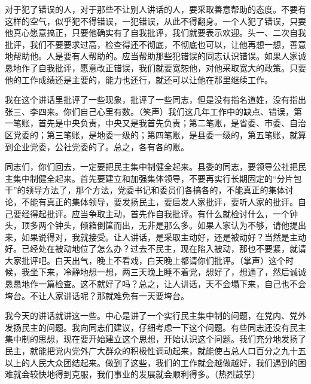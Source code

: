 对于犯了错误的人，对于那些不让别人讲话的人，要采取善意帮助的态度。不要有这样的空气，似乎犯不得错误，一犯错误，从此不得翻身。一个人犯了错误，只要他真心愿意搞正，只要他确实有了自我批评，我们就要表示欢迎。头一、二次自我批评，我们不要要求过高，检查得还不彻底，不彻底也可以，让他再想一想，善意地帮助他。人是要有人帮助的。应当帮助那些犯错误的同志认识错误。如果人家诚恳地作了自我批评，愿意改正错误，我们就要宽恕他，对他采取宽大的政策。只要他的工作成绩还是主要的，能力也还行，就还可以让他在那里继续工作。

我在这个讲话里批评了一些现象，批评了一些同志，但是没有指名道姓，没有指出张三、李四来。你们自己心里有数。（笑声）我们这几年工作中的缺点、错误，第一笔账，首先是中央负责，中央又是我首先负责；第二笔账，是省委、市委、自治区党委的；第三笔账，是地委一级的；第四笔账，是县委一级的，第五笔账，就算到企业党委，公社党委的了。总之，各有各的账。

同志们，你们回去，一定要把民主集中制健全起来。县委的同志，要领导公社把民主集中制健全起来。首先要建立和加强集体领导，不要再实行长期固定的“分片包干”的领导方法了，那个方法，党委书记和委员们各搞各的，不能真正的集体讨论，不能有真正的集体领导，要发扬民主，要启发人家批评，要听人家的批评。自己要经得起批评。应当争取主动，首先作自我批评。有什么就检讨什么，一个钟头，顶多两个钟头，倾箱倒筐而出，无非是那么多。如果人家认为不够，请他提出来，如果说得对，我就接受。让人讲话，是采取主动好，还是被动好？当然是主动好。已经处在被动地位了怎么办？过去不民主，现在陷入被动，那也不要紧，就请大家批评吧。白天出气，晚上不看戏，白天晚上都请你们批评。（掌声）这个时候，我坐下来，冷静地想一想，两三天晚上睡不着党，想好了，想通了，然后诚诚恳恳地作一篇检查。这不就好了吗？总之，让人讲话，天不会塌下来，自己也不会垮台。不让人家讲话呢？那就难免有一天要垮台。

我今天的讲话就讲这一些。中心是讲了一个实行民主集中制的问题，在党内、党外发扬民主的问题。我向同志们建议，仔细考虑一下这个问题。有些同志还没有民主集中制的思想，现在要开始建立这个思想，开始认识这个问题。我们充分地发扬了民主，就能把党内党外广大群众的积极性调动起来，就能使占总人口百分之九十五以上的人民大众团结起来。做到了这些，我们的工作就会越做越好，我们遇到的困难就会较快地得到克服，我们事业的发展就会顺利得多。（热烈鼓掌）


